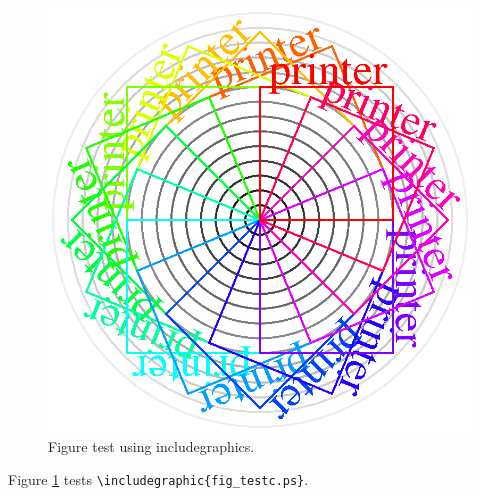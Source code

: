 \documentclass{article}
\begin{document}
\begin{figure}
\includegraphics{fig_testc.ps}
\caption{Figure test using includegraphics.} 
\label{figure4}
\end{figure}

Figure  \ref{figure4} tests \verb#\includegraphic{fig_testc.ps}#.  
\end{document}
